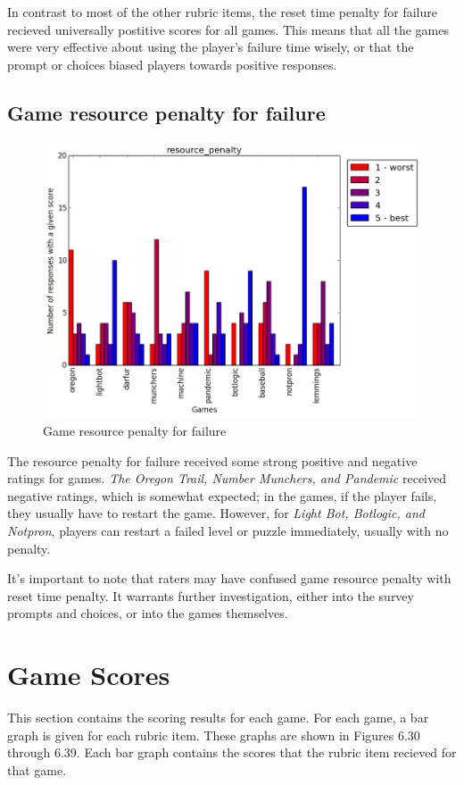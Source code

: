 				In contrast to most of the other rubric items, the reset time penalty for failure recieved universally postitive scores for all games. This means that all the games were very effective about using the player's failure time wisely, or that the prompt or choices biased players towards positive responses.

			\subsection{Game resource penalty for failure}
				\begin{figure}[] 
				\centering 
				\includegraphics[width=\textwidth, height=.4\textheight, keepaspectratio=true]{resource_penalty_scores.png} 
				\caption{Game resource penalty for failure}
				\end{figure}

				The resource penalty for failure received some strong positive and negative ratings for games. \textit{The Oregon Trail, Number Munchers, and Pandemic} received negative ratings, which is somewhat expected; in the games, if the player fails, they usually have to restart the game. However, for \textit{Light Bot, Botlogic, and Notpron}, players can restart a failed level or puzzle immediately, usually with no penalty.

				It's important to note that raters may have confused game resource penalty with reset time penalty. It warrants further investigation, either into the survey prompts and choices, or into the games themselves.

			\clearpage

		\section{Game Scores}
			This section contains the scoring results for each game. For each game, a bar graph is given for each rubric item. These graphs are shown in Figures 6.30 through 6.39. Each bar graph contains the scores that the rubric item recieved for that game.

